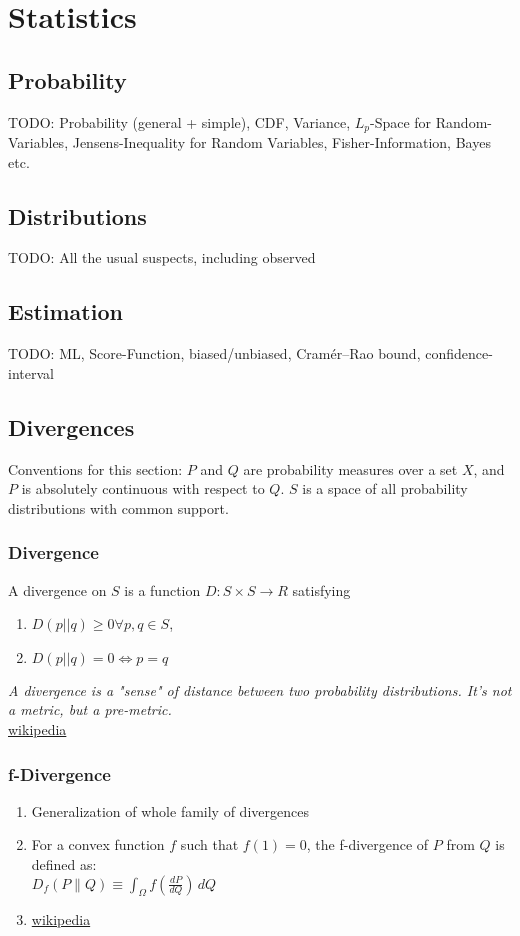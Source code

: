 \section{Statistics}

\theoremstyle{definition}
\newtheorem{definition}{Definition}[section]

\subsection{Probability}
TODO: Probability (general + simple), CDF, Variance, $L_p$-Space for Random-Variables, Jensens-Inequality for Random Variables, Fisher-Information, Bayes etc.

\subsection{Distributions}
TODO: All the usual suspects, including observed

\subsection{Estimation}
TODO: ML, Score-Function, biased/unbiased, Cramér–Rao bound, confidence-interval

\subsection{Divergences}
Conventions for this section: $P$ and $Q$ are probability measures over a set $X$, and $P$ is absolutely continuous with respect to $Q$. $S$ is a space of all probability distributions with common support.
\subsubsection{Divergence}
A divergence on $S$ is a function $D: S \times S \rightarrow R$ satisfying
\begin{enumerate}
	\item $D(p || q) \geq 0  \forall p, q \in S$,
	\item $D(p || q) = 0 \Leftrightarrow p = q$
\end{enumerate}
\textit{A divergence is a "sense" of distance between two probability distributions. It's not a metric, but a pre-metric.}\\
\href{https://en.wikipedia.org/wiki/Divergence_(statistics)}{wikipedia}

\subsubsection{f-Divergence}
\begin{enumerate}
	\item Generalization of whole family of divergences
	\item For a convex function $f$ such that $f(1) = 0$, the f-divergence of $P$ from $Q$ is defined as:\\
	$D_{f}(P\parallel Q)\equiv \int _{{\Omega }}f\left({\frac{dP}{dQ}}\right)\,dQ$
	\item \href{https://en.wikipedia.org/wiki/Divergence_(statistics)}{wikipedia}
\end{enumerate}

